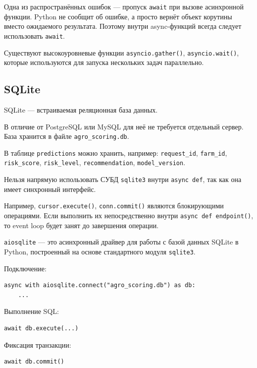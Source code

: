 \documentclass[12pt,a4paper]{article}
\begin{document}
Одна из распространённых ошибок — пропуск \texttt{await} при вызове асинхронной функции. Python не сообщит об ошибке, а просто вернёт объект корутины вместо ожидаемого результата. Поэтому внутри async-функций всегда следует использовать \texttt{await}.

Существуют высокоуровневые функции \texttt{asyncio.gather()}, \texttt{asyncio.wait()}, которые используются для запуска нескольких задач параллельно.

\subsection{SQLite}

SQLite — встраиваемая реляционная база данных.

В отличие от PostgreSQL или MySQL для неё не требуется отдельный сервер. База хранится в файле \texttt{agro\_scoring.db}.

В таблице \texttt{predictions} можно хранить, например: \texttt{request\_id}, \texttt{farm\_id}, \texttt{risk\_score}, \texttt{risk\_level}, \texttt{recommendation}, \texttt{model\_version}.

Нельзя напрямую использовать СУБД \texttt{sqlite3} внутри \texttt{async def}, так как она имеет синхронный интерфейс.

Например, \texttt{cursor.execute()}, \texttt{conn.commit()} являются блокирующими операциями. Если выполнить их непосредственно внутри \texttt{async def endpoint()}, то event loop будет занят до завершения операции.

\texttt{aiosqlite} — это асинхронный драйвер для работы с базой данных SQLite в Python, построенный на основе стандартного модуля \texttt{sqlite3}.

Подключение:

\begin{lstlisting}[caption={Подключение к SQLite}]
async with aiosqlite.connect("agro_scoring.db") as db:
    ...
\end{lstlisting}

Выполнение SQL:

\begin{lstlisting}[caption={Выполнение SQL}]
await db.execute(...)
\end{lstlisting}

Фиксация транзакции:

\begin{lstlisting}[caption={Фиксация транзакции}]
await db.commit()
\end{lstlisting}
\end{document}

